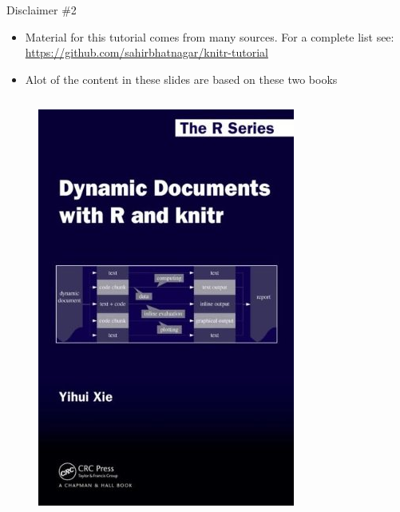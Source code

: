 \documentclass[10pt]{beamer}\usepackage[]{graphicx}\usepackage[]{color}
\begin{document}
\begin{frame}{Disclaimer \#2}

\begin{itemize}
\item Material for this tutorial comes from many sources. For a complete list see:  \href{https://github.com/sahirbhatnagar/knitr-tutorial}{https://github.com/sahirbhatnagar/knitr-tutorial}
\item Alot of the content in these slides are based on these two books
\end{itemize}

\begin{columns}[c] %
\begin{figure}
\includegraphics[width=0.6\columnwidth]{yihui.png}
\end{figure}


\end{columns}
\end{frame}
\end{document}
